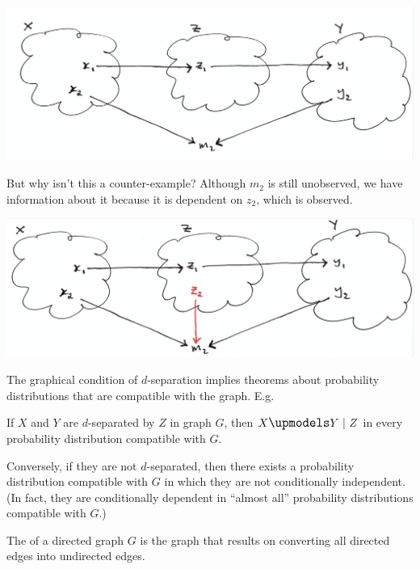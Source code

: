 \includegraphics[width=400pt]{img/statistics-and-machine-learning--pearl--causality--conditional-independence-and-graphoids-1231.png}

But why isn't this a counter-example? Although $m_2$ is still unobserved, we have information about it because
it is dependent on $z_2$, which is observed.

\includegraphics[width=400pt]{img/statistics-and-machine-learning--pearl--causality--conditional-independence-and-graphoids-7e5e.png}

The graphical condition of $d$-separation implies theorems about probability distributions that are compatible with the graph. E.g.

\begin{theorem}
  If $X$ and $Y$ are $d$-separated by $Z$ in graph $G$, then $X \indep Y ~|~ Z$ in every probability
  distribution compatible with $G$.

  Conversely, if they are not $d$-separated, then there exists a probability distribution compatible with $G$
  in which they are not conditionally independent. (In fact, they are conditionally dependent in ``almost all''
  probability distributions compatible with $G$.)
\end{theorem}

\begin{definition}[Skeleton]
  The  of a directed graph $G$ is the graph that results on converting all directed edges into
  undirected edges.
\end{definition}

